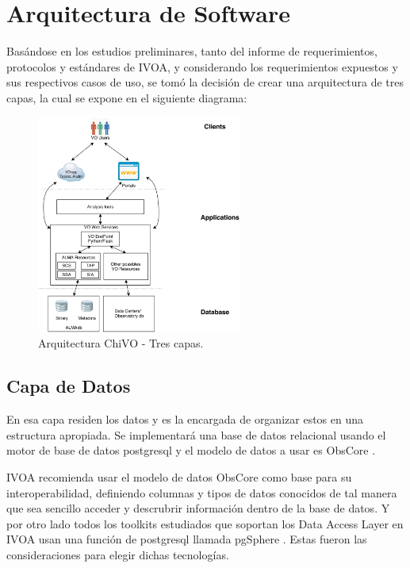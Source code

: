 \section{Arquitectura de Software}

Basándose en los estudios preliminares, tanto del informe de requerimientos,
protocolos y estándares de IVOA, y considerando los requerimientos expuestos y
sus respectivos casos de uso, se tomó la decisión de crear una arquitectura de
tres capas, la cual se expone en el siguiente diagrama:
\vspace{1.0cm}
\begin{figure}[h!t]
    \begin{center}
        \includegraphics[width=0.6\textwidth]{img/chivo_capas.png}
        \caption{Arquitectura ChiVO - Tres capas.}
    \end{center}
\end{figure}

\subsection{Capa de Datos}
En esa capa residen los datos y es la encargada de organizar estos en una
estructura apropiada. Se implementará una base de datos relacional usando el
motor de base de datos postgresql \cite{psql} y el modelo de datos a usar es
ObsCore \cite{obscore}.

IVOA recomienda usar el modelo de datos ObsCore como base para su
interoperabilidad, definiendo columnas y tipos de datos conocidos de tal manera
que sea sencillo acceder y descrubrir información dentro de la base de datos. Y
por otro lado todos los toolkits estudiados que soportan los Data Access Layer
en IVOA usan una función de postgresql llamada pgSphere \cite{pgsphere}. Estas
fueron las consideraciones para elegir dichas tecnologías.

